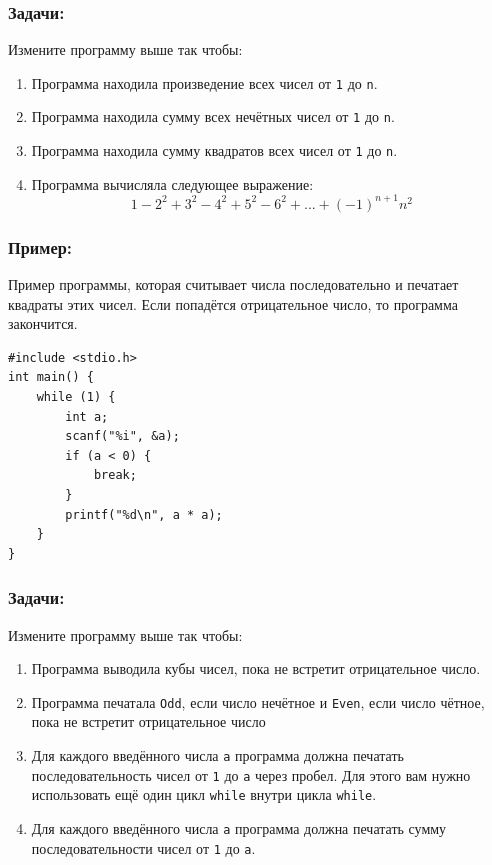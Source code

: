 \documentclass{article}
\begin{document}
\subsubsection*{Задачи:}
Измените программу выше так чтобы:
\begin{enumerate}
\item Программа находила произведение всех чисел от \texttt{1} до \texttt{n}.
\item Программа находила сумму всех нечётных чисел от \texttt{1} до \texttt{n}.
\item Программа находила сумму квадратов всех чисел от \texttt{1} до \texttt{n}.
\item Программа вычисляла следующее выражение:
$$
1 - 2^2 + 3^2 - 4^2 + 5^2 - 6^2 + ... + (-1)^{n + 1} n^2
$$
\end{enumerate}

\subsubsection*{Пример:}
Пример программы, которая считывает числа последовательно и печатает квадраты этих чисел. Если попадётся отрицательное число, то программа закончится.
\begin{lstlisting}
#include <stdio.h>
int main() {
    while (1) {
    	int a;
    	scanf("%i", &a);
    	if (a < 0) {
    		break;
    	}
        printf("%d\n", a * a);
    }
}
\end{lstlisting}

\subsubsection*{Задачи:}
Измените программу выше так чтобы:
\begin{enumerate}
\item Программа выводила кубы чисел, пока не встретит отрицательное число.
\item Программа печатала \texttt{Odd}, если число нечётное и \texttt{Even}, если число чётное, пока не встретит отрицательное число
\item Для каждого введённого числа \texttt{a} программа должна печатать последовательность чисел от \texttt{1} до \texttt{a} через пробел. Для этого вам нужно использовать ещё один цикл \texttt{while} внутри цикла \texttt{while}.
\item Для каждого введённого числа \texttt{a} программа должна печатать сумму последовательности чисел от \texttt{1} до \texttt{a}.
\end{enumerate}
\end{document}
